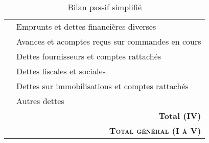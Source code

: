\begin{table}[h]
\begin{tabular}{|l|p{6.5cm}|}
\cline{2-2}                                                                                                                                                  
                                                                                              & Emprunts et dettes financières diverses                 \\ 
\cline{2-2}                                                                                                                                                  
                                                                                              & Avances et acomptes reçus sur commandes en cours        \\ 
\cline{2-2}                                                                                                                                                  
                                                                                              &  Dettes fournisseurs et comptes rattachés               \\ 
\cline{2-2}                                                                                                                                                  
                                                                                              & Dettes fiscales et sociales                             \\ 
\cline{2-2}                                                                                                                                                  
                                                                                              & Dettes sur immobilisations et comptes rattachés		    \\ 
\cline{2-2}                                                                                                                                                  
                                                                                              & Autres dettes                                           \\ 
\cline{2-2}                                                                                                                                                 
                                                                                              & \multicolumn{1}{r|}{\textbf{Total (IV)}}                \\                                                                                   
\hline                                                                                                                                                                      
 \multicolumn{2}{|r|}{\textbf{\textsc{Total général (I à V)}}}  \\
\hline                                                                                                                                                                                                                                                                                                       
\end{tabular}
\label{bilanPassif}
\caption{Bilan passif simplifié}
\end{table}